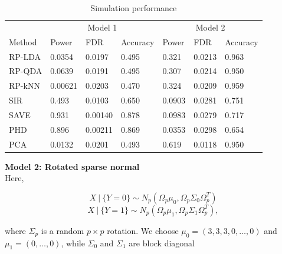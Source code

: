 \documentclass[12pt]{article}
\begin{document}
\begin{table}
  \caption{Simulation performance}
  \label{sample-table}
  \centering
  \begin{tabular}{l|lll|lll}
    \toprule
    & \multicolumn{3}{c}{Model 1} & \multicolumn{3}{c}{Model 2}                     \\
    \cmidrule(r){1-7}
    Method     & Power     & FDR & Accuracy &  Power     & FDR & Accuracy   \\
   
    \midrule
    RP-LDA & 0.0354 & 0.0197  &  0.495 & 0.321 &   0.0213 & 0.963 \\
    RP-QDA & 0.0639  & 0.0191 & 0.495 & 0.307 &    0.0214 & 0.950 \\
    RP-kNN & 0.00621  & 0.0203 & 0.470 & 0.324 &   0.0209 & 0.959 \\
    SIR & 0.493 &  0.0103 & 0.650 &  0.0903 &      0.0281 & 0.751 \\
    SAVE & 0.931 & 0.00140 & 0.878 & 0.0983 &      0.0279 & 0.717 \\
    PHD & 0.896 & 0.00211 & 0.869 & 0.0353 &       0.0298 & 0.654 \\
    PCA & 0.0132 & 0.0201 & 0.493 & 0.619 &        0.0118 & 0.950 \\
    \bottomrule
  \end{tabular}
\end{table}




\noindent\textbf{Model 2: Rotated sparse normal}\\
Here,

\[X \ | \ \{Y = 0\} \sim N_p(\Omega_p\mu_0, \Omega_p \Sigma_0 \Omega_p^T)  \] 
\[X \ | \ \{Y = 1\} \sim N_p(\Omega_p\mu_1, \Omega_p\Sigma_1\Omega_p^T),  \]

where $\Sigma_p$ is a random $p\times p$ rotation. We choose $\mu_0 = (3, 3, 3, 0, \ldots, 0)$ and $\mu_1 = (0, \ldots, 0)$, while $\Sigma_0$ and $\Sigma_1$ are block diagonal
\end{document}

